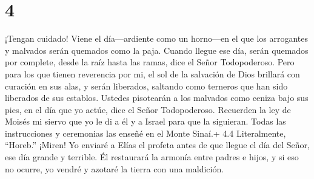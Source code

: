 \hypertarget{section-3}{%
\section{4}\label{section-3}}

 ¡Tengan cuidado! Viene el día---ardiente como un horno---en
el que los arrogantes y malvados serán quemados como la paja. Cuando
llegue ese día, serán quemados por complete, desde la raíz hasta las
ramas, dice el Señor Todopoderoso.  Pero para los que tienen
reverencia por mi, el sol de la salvación de Dios brillará con curación
en sus alas, y serán liberados, saltando como terneros que han sido
liberados de sus establos.  Ustedes pisotearán a los
malvados como ceniza bajo sus pies, en el día que yo actúe, dice el
Señor Todopoderoso.  Recuerden la ley de Moisés mi siervo
que yo le di a él y a Israel para que la siguieran. Todas las
instrucciones y ceremonias las enseñé en el Monte Sinaí.+ 4.4
Literalmente, ``Horeb.''  ¡Miren! Yo enviaré a Elías el
profeta antes de que llegue el día del Señor, ese día grande y terrible.
 Él restaurará la armonía entre padres e hijos, y si eso no
ocurre, yo vendré y azotaré la tierra con una maldición.
